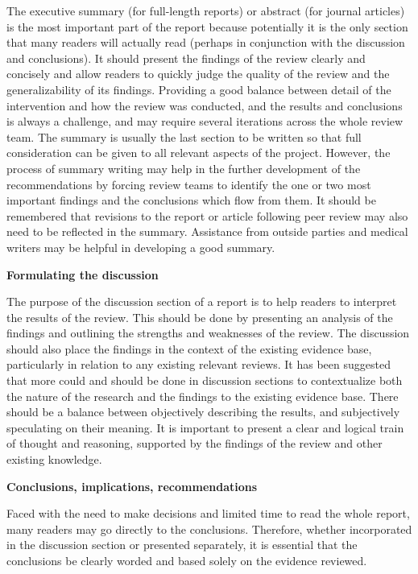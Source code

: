 \documentclass[
  11pt,
  a4paper,
  DIV=11,
  numbers=noendperiod]{scrreprt}
\begin{document}
The executive summary (for full-length reports) or abstract (for journal
articles) is the most important part of the report because potentially
it is the only section that many readers will actually read (perhaps in
conjunction with the discussion and conclusions). It should present the
findings of the review clearly and concisely and allow readers to
quickly judge the quality of the review and the generalizability of its
findings. Providing a good balance between detail of the intervention
and how the review was conducted, and the results and conclusions is
always a challenge, and may require several iterations across the whole
review team. The summary is usually the last section to be written so
that full consideration can be given to all relevant aspects of the
project. However, the process of summary writing may help in the further
development of the recommendations by forcing review teams to identify
the one or two most important findings and the conclusions which flow
from them. It should be remembered that revisions to the report or
article following peer review may also need to be reflected in the
summary. Assistance from outside parties and medical writers may be
helpful in developing a good summary.

\textbf{Formulating the discussion}

The purpose of the discussion section of a report is to help readers to
interpret the results of the review. This should be done by presenting
an analysis of the findings and outlining the strengths and weaknesses
of the review. The discussion should also place the findings in the
context of the existing evidence base, particularly in relation to any
existing relevant reviews. It has been suggested that more could and
should be done in discussion sections to contextualize both the nature
of the research and the findings to the existing evidence base. There
should be a balance between objectively describing the results, and
subjectively speculating on their meaning. It is important to present a
clear and logical train of thought and reasoning, supported by the
findings of the review and other existing knowledge.

\textbf{Conclusions, implications, recommendations}

Faced with the need to make decisions and limited time to read the whole
report, many readers may go directly to the conclusions. Therefore,
whether incorporated in the discussion section or presented separately,
it is essential that the conclusions be clearly worded and based solely
on the evidence reviewed.
\end{document}
